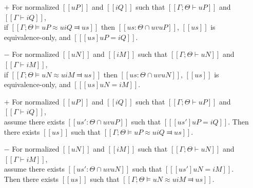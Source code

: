 \begin{lemma} \label{lemma:unification-soundness}
    \hfill
    \begin{itemize}
        \item [$+$] For normalized $[[uP]]$ and $[[iQ]]$ such that 
        $[[Γ ; Θ ⊢ uP]]$ and $[[Γ ⊢ iQ]]$,\\ 
        if $[[Γ ; Θ ⊨ uP ≈u iQ ⫤ us]]$ then $[[us : Θ ∩ uv uP]]$, 
        $[[us]]$ is equivalence-only, and $[[ [us]uP = iQ ]]$.

        \item [$-$] For normalized $[[uN]]$ and $[[iM]]$ such that
        $[[Γ ; Θ ⊢ uN]]$ and $[[Γ ⊢ iM]]$,\\
        if $[[Γ ; Θ ⊨ uN ≈u iM ⫤ us]]$ then $[[us : Θ ∩ uv uN]]$,
        $[[us]]$ is equivalence-only, and $[[ [us]uN = iM ]]$.
    \end{itemize}
\end{lemma}

\begin{lemma} \label{lemma:unification-completeness}
    \hfill
    \begin{itemize}
        \item [$+$] For normalized $[[uP]]$ and $[[iQ]]$ such that
        $[[Γ ; Θ ⊢ uP]]$ and $[[Γ ⊢ iQ]]$,\\ 
        assume there exists $[[us' : Θ ∩ uv uP]]$ such that
        $[[ [us']uP = iQ ]]$. Then there exists $[[us]]$ such that
        $[[Γ ; Θ ⊨ uP ≈u iQ ⫤ us]]$.

        \item [$-$] For normalized $[[uN]]$ and $[[iM]]$ such that
        $[[Γ ; Θ ⊢ uN]]$ and $[[Γ ⊢ iM]]$,\\
        assume there exists $[[us' : Θ ∩ uv uN]]$ such that
        $[[ [us']uN = iM ]]$. Then there exists $[[us]]$ such that
        $[[Γ ; Θ ⊨ uN ≈u iM ⫤ us]]$.
   \end{itemize}
\end{lemma}